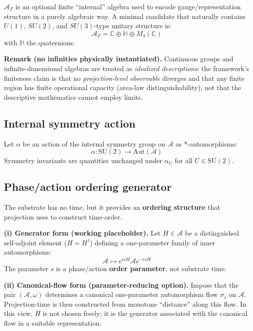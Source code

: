 \documentclass[reprint, amsmath, amssymb, aps, prd]{revtex4-2}
\begin{document}
$\mathcal{A}_F$ is an optional finite ``internal'' algebra used to encode gauge/representation structure in a purely algebraic way. A minimal candidate that naturally contains $U(1)$, $SU(2)$, and $SU(3)$-type unitary structure is:
\begin{equation}
\mathcal{A}_F = \mathbb{C} \oplus \mathbb{H} \oplus M_3(\mathbb{C})
\end{equation}
with $\mathbb{H}$ the quaternions.

\textbf{Remark (no infinities physically instantiated).} Continuous groups and infinite-dimensional algebras are treated as \textit{idealized descriptions}: the framework's finiteness claim is that no \textit{projection-level observable} diverges and that any finite region has finite operational capacity (area-law distinguishability), not that the descriptive mathematics cannot employ limits.

\subsection{Internal symmetry action}
Let $\alpha$ be an action of the internal symmetry group on $\mathcal{A}$ as *-automorphisms:
\begin{equation}
\alpha: \text{SU}(2) \to \text{Aut}(\mathcal{A})
\end{equation}
Symmetry invariants are quantities unchanged under $\alpha_U$ for all $U \in \text{SU}(2)$.

\subsection{Phase/action ordering generator}
The substrate has no time, but it provides an \textbf{ordering structure} that projection uses to construct time-order.

\textbf{(i) Generator form (working placeholder).} Let $H \in \mathcal{A}$ be a distinguished self-adjoint element ($H = H^\dagger$) defining a one-parameter family of inner automorphisms:
\begin{equation}
\mathcal{A} \mapsto e^{isH} \mathcal{A} e^{-isH}
\end{equation}
The parameter $s$ is a phase/action \textbf{order parameter}, not substrate time.

\textbf{(ii) Canonical-flow form (parameter-reducing option).} Impose that the pair $(\mathcal{A}, \omega)$ determines a canonical one-parameter automorphism flow $\sigma_s$ on $\mathcal{A}$. Projection-time is then constructed from monotone ``distance'' along this flow. In this view, $H$ is not chosen freely; it is the generator associated with the canonical flow in a suitable representation.
\end{document}
